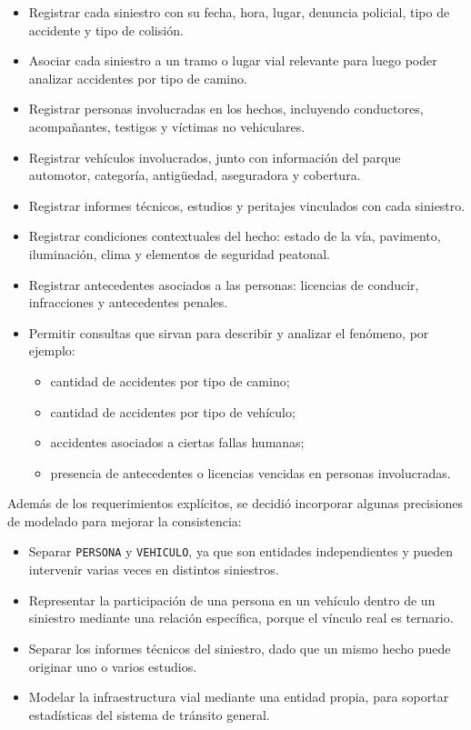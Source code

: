 \documentclass[12pt,a4paper]{article}
\begin{document}
\begin{itemize}[leftmargin=*]
    \item Registrar cada siniestro con su fecha, hora, lugar, denuncia policial, tipo de accidente y tipo de colisión.
    \item Asociar cada siniestro a un tramo o lugar vial relevante para luego poder analizar accidentes por tipo de camino.
    \item Registrar personas involucradas en los hechos, incluyendo conductores, acompañantes, testigos y víctimas no vehiculares.
    \item Registrar vehículos involucrados, junto con información del parque automotor, categoría, antigüedad, aseguradora y cobertura.
    \item Registrar informes técnicos, estudios y peritajes vinculados con cada siniestro.
    \item Registrar condiciones contextuales del hecho: estado de la vía, pavimento, iluminación, clima y elementos de seguridad peatonal.
    \item Registrar antecedentes asociados a las personas: licencias de conducir, infracciones y antecedentes penales.
    \item Permitir consultas que sirvan para describir y analizar el fenómeno, por ejemplo:
    \begin{itemize}
        \item cantidad de accidentes por tipo de camino;
        \item cantidad de accidentes por tipo de vehículo;
        \item accidentes asociados a ciertas fallas humanas;
        \item presencia de antecedentes o licencias vencidas en personas involucradas.
    \end{itemize}
\end{itemize}

Además de los requerimientos explícitos, se decidió incorporar algunas precisiones de modelado para mejorar la consistencia:

\begin{itemize}[leftmargin=*]
    \item Separar \texttt{PERSONA} y \texttt{VEHICULO}, ya que son entidades independientes y pueden intervenir varias veces en distintos siniestros.
    \item Representar la participación de una persona en un vehículo dentro de un siniestro mediante una relación específica, porque el vínculo real es ternario.
    \item Separar los informes técnicos del siniestro, dado que un mismo hecho puede originar uno o varios estudios.
    \item Modelar la infraestructura vial mediante una entidad propia, para soportar estadísticas del sistema de tránsito general.
\end{itemize}
\end{document}
